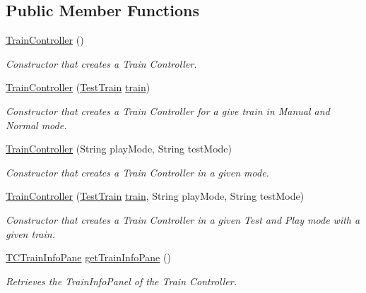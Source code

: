 \subsection*{Public Member Functions}
\begin{DoxyCompactItemize}
\item 
\hyperlink{classTrainControllerComps_1_1TrainController_ad8203c295c6057d7b33da675227cd861}{Train\+Controller} ()
\begin{DoxyCompactList}\small\item\em Constructor that creates a Train Controller. \end{DoxyCompactList}\item 
\hyperlink{classTrainControllerComps_1_1TrainController_a3344359acd0fcf8829763360fbe0a68a}{Train\+Controller} (\hyperlink{classTrainControllerComps_1_1TestTrain}{Test\+Train} \hyperlink{classtrain}{train})
\begin{DoxyCompactList}\small\item\em Constructor that creates a Train Controller for a give train in Manual and Normal mode. \end{DoxyCompactList}\item 
\hyperlink{classTrainControllerComps_1_1TrainController_aff04f9677f4ac86f806e8a909bf9d511}{Train\+Controller} (String play\+Mode, String test\+Mode)
\begin{DoxyCompactList}\small\item\em Constructor that creates a Train Controller in a given mode. \end{DoxyCompactList}\item 
\hyperlink{classTrainControllerComps_1_1TrainController_a95ed9487bd1f1511c0718a13caa1d573}{Train\+Controller} (\hyperlink{classTrainControllerComps_1_1TestTrain}{Test\+Train} \hyperlink{classtrain}{train}, String play\+Mode, String test\+Mode)
\begin{DoxyCompactList}\small\item\em Constructor that creates a Train Controller in a given Test and Play mode with a given train. \end{DoxyCompactList}\item 
\hyperlink{classTrainControllerComps_1_1TCTrainInfoPane}{T\+C\+Train\+Info\+Pane} \hyperlink{classTrainControllerComps_1_1TrainController_ade09a96255871c37628faf44250981fe}{get\+Train\+Info\+Pane} ()
\begin{DoxyCompactList}\small\item\em Retrieves the Train\+Info\+Panel of the Train Controller. \end{DoxyCompactList}\item 

\end{DoxyCompactItemize}

